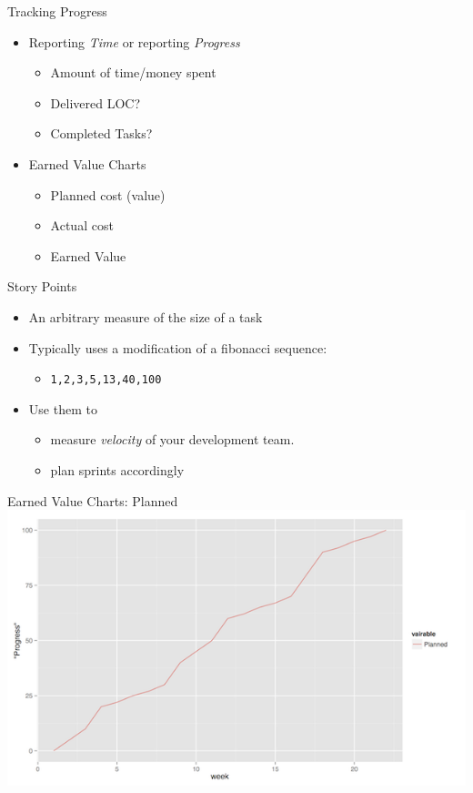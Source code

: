 \documentclass[10pt,t,a4paper]{beamer}
\begin{document}
\begin{frame}[label=sec-1-9]{Tracking Progress}
\begin{itemize}
\item Reporting \emph{Time} or reporting \emph{Progress}
\begin{itemize}
\item Amount of time/money spent
\item Delivered LOC?
\item Completed Tasks?
\end{itemize}
\item Earned Value Charts
\begin{itemize}
\item Planned cost (value)
\item Actual cost
\item Earned Value
\end{itemize}
\end{itemize}
\end{frame}
\begin{frame}[fragile,label=sec-1-10]{Story Points}
 \begin{itemize}
\item An arbitrary measure of the size of a task
\item Typically uses a modification of a fibonacci sequence:
\begin{itemize}
\item \verb~1,2,3,5,13,40,100~
\end{itemize}
\item Use them to
\begin{itemize}
\item measure \emph{velocity} of your development team.
\item plan sprints accordingly
\end{itemize}
\end{itemize}
\end{frame}
\begin{frame}[label=sec-1-11]{Earned Value Charts: Planned}
\includegraphics[width=.9\linewidth]{../Site/images/IEV_Planned.png}
\end{frame}
\end{document}
